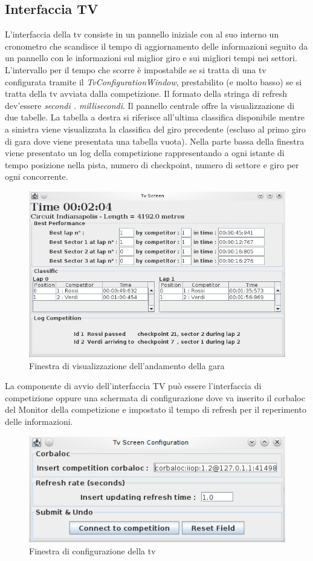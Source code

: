 \subsection{Interfaccia TV}
\label{interfacciaTv}
L'interfaccia della tv consiste in un pannello iniziale con al suo interno un cronometro che scandisce il tempo di aggiornamento delle informazioni seguito da un pannello con le informazioni sul miglior giro e sui migliori tempi nei settori.
L'intervallo per il tempo che scorre \`{e} impostabile se si tratta di una tv configurata tramite il \emph{TvConfigurationWindow}, prestabilito (e molto basso) se si tratta della tv avviata dalla competizione. Il formato della stringa di refresh dev'essere \emph{secondi . millisecondi}.
Il pannello centrale offre la visualizzazione di due tabelle. La tabella a destra si riferisce all'ultima classifica disponibile mentre a sinistra viene visualizzata la classifica del giro precedente (escluso al primo giro di gara dove viene presentata una tabella vuota).
Nella parte bassa della finestra viene presentato un log della competizione rappresentando a ogni istante di tempo posizione nella pista, numero di checkpoint, numero di settore e giro per ogni concorrente.
\begin{center}
\begin{figure}[h]
	\includegraphics[scale=0.75]{img/ScreenshotRelazione/screenTvCompetition.jpg}
	\caption{Finestra di visualizzazione dell'andamento della gara}
\end{figure}
\end{center}
La componente di avvio dell'interfaccia TV pu\`{o} essere l'interfaccia di competizione oppure una schermata di configurazione dove va inserito il corbaloc del Monitor della competizione e impostato il tempo di refresh per il reperimento delle informazioni.
\begin{center}
\begin{figure}[H]
	\includegraphics[scale=0.75]{img/ScreenshotRelazione/configurationScreen.jpg}
	\caption{Finestra di configurazione della tv}
\end{figure}
\end{center}